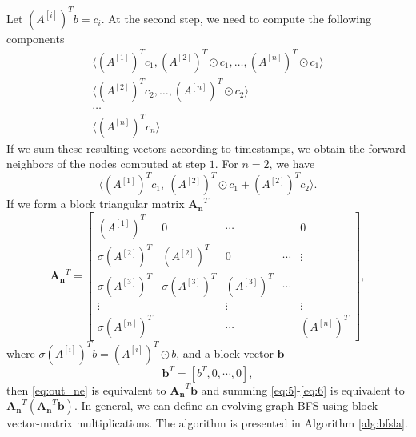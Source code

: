 \documentclass[11pt, conference, , compsocconf]{IEEEtran}
\theoremstyle{definition}
\begin{document}
Let $(A^{[i]})^Tb = c_i$.
At the second step, we need to compute the following components
\begin{align}
  \label{eq:5}
 \big\langle (A^{[1]})^Tc_1,   (A^{[2]})^T\odot c_1, \ldots,  (A^{[n]})^T\odot c_1  \big\rangle  \\  
\big\langle (A^{[2]})^Tc_{2}, \ldots, (A^{[n]})^T\odot c_{2} \big\rangle \\
 \ldots  \\
  \big\langle (A^{[n]})^Tc_n \big\rangle 
\label{eq:6}
\end{align}
If we sum these resulting vectors according to timestamps, we obtain 
the forward-neighbors of the nodes computed at step $1$.
For $n =2$, we have 
\[
\Big\langle
(A^{[1]})^Tc_1,~
(A^{[2]})^T\odot c_1 + (A^{[2]})^T c_2
\Big\rangle.
\]
If we form a block triangular matrix $\bm{A_n}^T$ 
\[
\bm{A_n}^T = 
\begin{bmatrix}
(A^{[1]})^T &   0            & \cdots  &  & 0 \\
\sigma(A^{[2]})^T & (A^{[2]})^T & 0         &\cdots  & \vdots \\
\sigma(A^{[3]})^T & \sigma(A^{[3]})^T & (A^{[3]})^T & \cdots \\
   \vdots              &                              &      \vdots            &  &  \vdots \\
\sigma(A^{[n]})^T &                  &       \cdots                      &  & (A^{[n]})^T 
\end{bmatrix},
\]
where  $\sigma(A^{[i]})^Tb = (A^{[i]})^T\odot b$, and a block vector $\bm{b}$ 
\[
\bm{b}^T = [b^T, 0, \cdots, 0  ],
\]
then \eqref{eq:out_ne} is equivalent to $\bm{A_n}^T\bm{b}$ and 
summing \eqref{eq:5}-\eqref{eq:6} is equivalent to $\bm{A_n}^T(\bm{A_n}^T\bm{b})$. 
In general, we can define an evolving-graph BFS using 
block vector-matrix multiplications. The algorithm is presented in Algorithm
\ref{alg:bfsla}.
\end{document}
